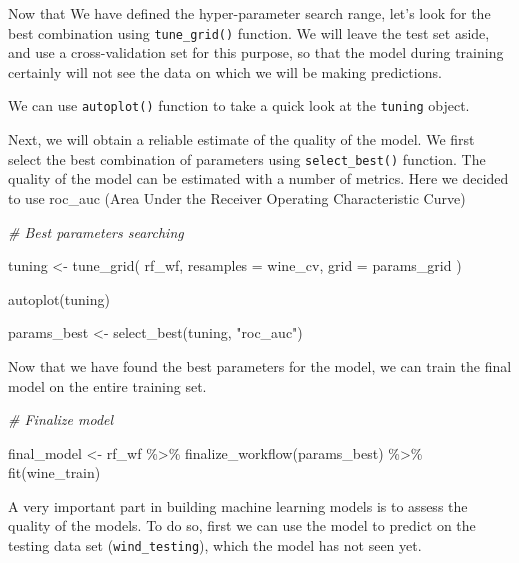 \documentclass[
]{book}
\newenvironment{Shaded}{\begin{snugshade}}{\end{snugshade}}
\newcommand{\AttributeTok}[1]{\textcolor[rgb]{0.77,0.63,0.00}{#1}}
\newcommand{\CommentTok}[1]{\textcolor[rgb]{0.56,0.35,0.01}{\textit{#1}}}
\newcommand{\FunctionTok}[1]{\textcolor[rgb]{0.00,0.00,0.00}{#1}}
\newcommand{\NormalTok}[1]{#1}
\newcommand{\OtherTok}[1]{\textcolor[rgb]{0.56,0.35,0.01}{#1}}
\newcommand{\SpecialCharTok}[1]{\textcolor[rgb]{0.00,0.00,0.00}{#1}}
\newcommand{\StringTok}[1]{\textcolor[rgb]{0.31,0.60,0.02}{#1}}
\begin{document}
Now that We have defined the hyper-parameter search range, let's look for the best combination using \texttt{tune\_grid()} function. We will leave the test set aside, and use a cross-validation set for this purpose, so that the model during training certainly will not see the data on which we will be making predictions.

We can use \texttt{autoplot()} function to take a quick look at the \texttt{tuning} object.

Next, we will obtain a reliable estimate of the quality of the model. We first select the best combination of parameters using \texttt{select\_best()} function. The quality of the model can be estimated with a number of metrics. Here we decided to use roc\_auc (Area Under the Receiver Operating Characteristic Curve)

\begin{Shaded}
\begin{Highlighting}[]
\CommentTok{\# Best parameters searching}

\NormalTok{tuning }\OtherTok{\textless{}{-}} \FunctionTok{tune\_grid}\NormalTok{(}
\NormalTok{  rf\_wf,}
  \AttributeTok{resamples =}\NormalTok{ wine\_cv,}
  \AttributeTok{grid =}\NormalTok{ params\_grid}
\NormalTok{)}

\FunctionTok{autoplot}\NormalTok{(tuning)}

\NormalTok{params\_best }\OtherTok{\textless{}{-}} \FunctionTok{select\_best}\NormalTok{(tuning, }\StringTok{"roc\_auc"}\NormalTok{)}
\end{Highlighting}
\end{Shaded}

Now that we have found the best parameters for the model, we can train the final model on the entire training set.

\begin{Shaded}
\begin{Highlighting}[]
\CommentTok{\# Finalize model }

\NormalTok{final\_model }\OtherTok{\textless{}{-}}\NormalTok{ rf\_wf }\SpecialCharTok{\%\textgreater{}\%}
  \FunctionTok{finalize\_workflow}\NormalTok{(params\_best) }\SpecialCharTok{\%\textgreater{}\%}
  \FunctionTok{fit}\NormalTok{(wine\_train)}
\end{Highlighting}
\end{Shaded}

A very important part in building machine learning models is to assess the quality of the models. To do so, first we can use the model to predict on the testing data set (\texttt{wind\_testing}), which the model has not seen yet.
\end{document}
